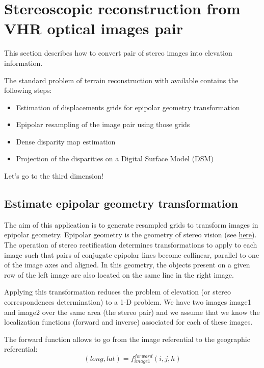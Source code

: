 \newpage
\section{Stereoscopic reconstruction from VHR optical images pair}\label{sec:stereoreconstruction}
This section describes how to convert pair of stereo images into elevation information.

The standard problem of terrain reconstruction with available \app contains
the following steps:

\begin{itemize}
\item Estimation of displacements grids for epipolar geometry transformation
\item Epipolar resampling of the image pair using those grids
\item Dense disparity map estimation
\item Projection of the disparities on a Digital Surface Model (DSM)
\end{itemize}

Let's go to the third dimension!

\subsection{Estimate epipolar geometry transformation}\label{ssec:epipolar}

The aim of this application is to generate resampled grids to
transform images in epipolar geometry. Epipolar geometry is the
geometry of stereo vision
(see \href{http://en.wikipedia.org/wiki/Epipolar_geometry}{here}). The
operation of stereo rectification determines transformations to apply
to each image such that pairs of conjugate epipolar lines become
collinear, parallel to one of the image axes and aligned. In this
geometry, the objects present on a given row of the left image are
also located on the same line in the right image.

Applying this transformation reduces the problem of elevation (or
stereo correspondences determination) to a 1-D problem. We have two
images image1 and image2 over the same area (the stereo pair) and we
assume that we know the localization functions (forward and inverse)
associated for each of these images.

The forward function allows to go from the image referential to the geographic
referential:
\begin{equation}
  (long,lat) = f^{forward}_{image1}(i,j,h)
\end{equation}

